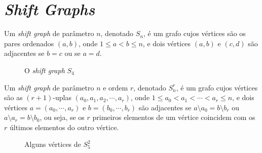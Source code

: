 \chapter{\textit{Shift Graphs}}
\label{cap:shift}

\begin{definicao}
Um \textit{shift graph} de parâmetro $n$, denotado $S_n$, é um grafo cujos vértices são os pares ordenados $(a,b)$, onde $1 \leq a < b \leq n$, e dois vértices $(a,b)$ e $(c,d)$ são adjacentes se $b = c$ ou se $a = d$.
\end{definicao}

\begin{figure}[H]
\centering
{}
\caption{O \textit{shift graph} $S_4$}
\label{fig:shiftgraph}
\end{figure}

\begin{definicao}
Um \textit{shift graph} de parâmetro $n$ e ordem $r$, denotado $S_n^r$, é um grafo cujos vértices são as $(r+1)$-uplas $(a_0, a_1, a_2, \cdots, a_r)$, onde $1 \leq a_0 < a_1 < \cdots < a_r \leq n$, e dois vértices $a = (a_0, \cdots, a_r)$ e $b = (b_0, \cdots, b_r)$ são adjacentes se $a\setminus a_0 = b\setminus b_r$ ou $a\setminus a_r = b\setminus b_0$, ou seja, se os $r$ primeiros elementos de um vértice coincidem com os $r$ últimos elementos do outro vértice.
\end{definicao}

\begin{figure}[H]
\centering
{}
\caption{Alguns vértices de $S_5^{2}$}
\label{fig:shiftgraphorder2}
\end{figure}

